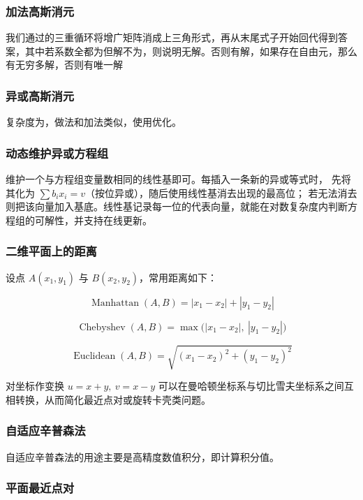 \documentclass[8pt,a4paper]{article}
\newcommand{\code}[1]{
    
}
\newcommand{\txt}[1]{\par\noindent\footnotesize #1}
\newcommand{\inlineformula}[1]{\ensuremath{}}
\begin{document}
\begin{multicols}{2}
        \subsubsection{加法高斯消元}
            \txt{我们通过\inlineformula{./assets/formulas_tex/formula_667.tex}的三重循环将增广矩阵消成上三角形式，再从末尾式子开始回代得到答案，其中若系数全都为\inlineformula{./assets/formulas_tex/formula_668.tex}但解不为\inlineformula{./assets/formulas_tex/formula_669.tex}，则说明无解。否则有解，如果存在自由元，那么有无穷多解，否则有唯一解}
            \code{src/number_theory/随机化算法_13_5.cpp}
        \subsubsection{异或高斯消元}
            \txt{复杂度为\inlineformula{./assets/formulas_tex/formula_670.tex}，做法和加法类似，使用\inlineformula{./assets/formulas_tex/formula_671.tex}优化。}
            \code{src/number_theory/随机化算法_14_5.cpp}
        \subsubsection{动态维护异或方程组}
            \txt{维护一个与方程组变量数相同的线性基即可。每插入一条新的异或等式时，
先将其化为 $\sum b_i x_i = v$（按位异或），随后使用线性基消去出现的最高位；
若无法消去则把该向量加入基底。线性基记录每一位的代表向量，就能在对数复杂度内判断方程组的可解性，并支持在线更新。}
        \subsubsection{二维平面上的距离}
            \txt{设点 $A(x_1,y_1)$ 与 $B(x_2,y_2)$，常用距离如下：}
            \txt{$$\operatorname{Manhattan}(A,B) = |x_1-x_2| + |y_1-y_2|$$}
            \txt{$$\operatorname{Chebyshev}(A,B) = \max\big(|x_1-x_2|,\ |y_1-y_2|\big)$$}
            \txt{$$\operatorname{Euclidean}(A,B) = \sqrt{(x_1-x_2)^2 + (y_1-y_2)^2}$$}
            \txt{对坐标作变换 $u = x + y,\ v = x - y$ 可以在曼哈顿坐标系与切比雪夫坐标系之间互相转换，从而简化最近点对或旋转卡壳类问题。}
        \subsubsection{自适应辛普森法}
            \txt{自适应辛普森法的用途主要是高精度数值积分，即计算积分值。}
            \code{src/number_theory/随机化算法_16_5.cpp}
        \subsubsection{平面最近点对}
            \code{src/number_theory/随机化算法_17_5.cpp}

\end{multicols}
\end{document}
